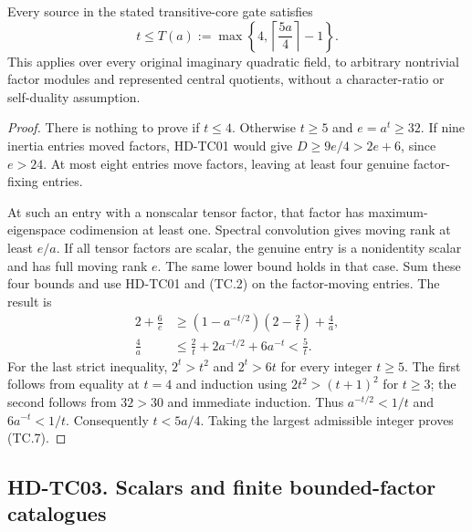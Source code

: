\begin{theorem}[HD-TC02]
Every source in the stated transitive-core gate satisfies
\[
 t\le T(a):=\max\left\{4,\left\lceil\frac{5a}{4}\right\rceil-1\right\}.
                                                               \tag{TC.7}
\]
This applies over every original imaginary quadratic field,
to arbitrary nontrivial factor modules and represented central
quotients, without a character-ratio or self-duality assumption.
\end{theorem}

\begin{proof}
There is nothing to prove if $t\le4$. Otherwise $t\ge5$
and $e=a^t\ge32$. If nine inertia entries moved factors,
HD-TC01 would give $D\ge9e/4>2e+6$, since $e>24$.
At most eight entries move factors, leaving at least four
genuine factor-fixing entries.

At such an entry with a nonscalar tensor factor, that
factor has maximum-eigenspace codimension at least one.
Spectral convolution gives moving rank at least $e/a$.
If all tensor factors are scalar, the genuine entry is
a nonidentity scalar and has full moving rank $e$.
The same lower bound holds in that case.
Sum these four bounds and use HD-TC01 and (TC.2) on the
factor-moving entries. The result is
\[
 \begin{split}
 2+\frac6e
 &\ge\left(1-a^{-t/2}\right)\left(2-\frac2t\right)+\frac4a,\\
 \frac4a&\le\frac2t+2a^{-t/2}+6a^{-t}<\frac5t.
 \end{split}                                             \tag{TC.8}
\]
For the last strict inequality, $2^t>t^2$ and $2^t>6t$
for every integer $t\ge5$. The first follows from equality
at $t=4$ and induction using $2t^2>(t+1)^2$ for $t\ge3$;
the second follows from $32>30$ and immediate induction.
Thus $a^{-t/2}<1/t$ and $6a^{-t}<1/t$.
Consequently $t<5a/4$. Taking the largest admissible integer
proves (TC.7).
\end{proof}

\subsection*{HD-TC03. Scalars and finite bounded-factor catalogues}

